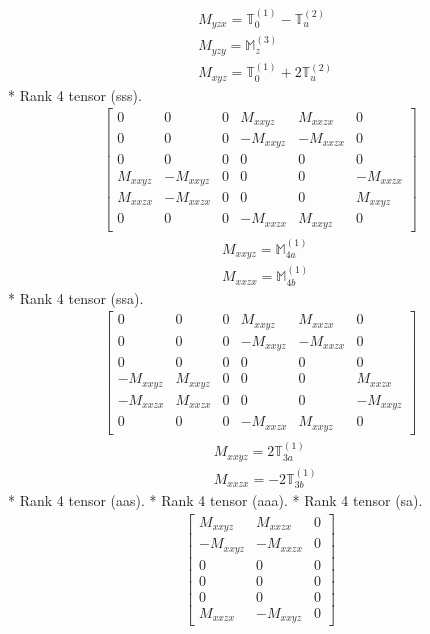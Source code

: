 \documentclass[fleqn,8pt,landscape]{jsarticle}
\begin{document}
\begin{align*}
& M_{yzx} = \mathbb{T}_{0}^{(1)} - \mathbb{T}_{u}^{(2)} \\
& M_{yzy} = \mathbb{M}_{z}^{(3)} \\
& M_{xyz} = \mathbb{T}_{0}^{(1)} + 2 \mathbb{T}_{u}^{(2)}
\end{align*}
* Rank 4 tensor (sss).
\begin{align*}
\begin{bmatrix} 0 & 0 & 0 & M_{xxyz} & M_{xxzx} & 0 \\ 0 & 0 & 0 & - M_{xxyz} & - M_{xxzx} & 0 \\ 0 & 0 & 0 & 0 & 0 & 0 \\ M_{xxyz} & - M_{xxyz} & 0 & 0 & 0 & - M_{xxzx} \\ M_{xxzx} & - M_{xxzx} & 0 & 0 & 0 & M_{xxyz} \\ 0 & 0 & 0 & - M_{xxzx} & M_{xxyz} & 0 \end{bmatrix}
\end{align*}
\begin{align*}
& M_{xxyz} = \mathbb{M}_{4a}^{(1)} \\
& M_{xxzx} = \mathbb{M}_{4b}^{(1)}
\end{align*}
* Rank 4 tensor (ssa).
\begin{align*}
\begin{bmatrix} 0 & 0 & 0 & M_{xxyz} & M_{xxzx} & 0 \\ 0 & 0 & 0 & - M_{xxyz} & - M_{xxzx} & 0 \\ 0 & 0 & 0 & 0 & 0 & 0 \\ - M_{xxyz} & M_{xxyz} & 0 & 0 & 0 & M_{xxzx} \\ - M_{xxzx} & M_{xxzx} & 0 & 0 & 0 & - M_{xxyz} \\ 0 & 0 & 0 & - M_{xxzx} & M_{xxyz} & 0 \end{bmatrix}
\end{align*}
\begin{align*}
& M_{xxyz} = 2 \mathbb{T}_{3a}^{(1)} \\
& M_{xxzx} = - 2 \mathbb{T}_{3b}^{(1)}
\end{align*}
* Rank 4 tensor (aas).
* Rank 4 tensor (aaa).
* Rank 4 tensor (sa).
\begin{align*}
\begin{bmatrix} M_{xxyz} & M_{xxzx} & 0 \\ - M_{xxyz} & - M_{xxzx} & 0 \\ 0 & 0 & 0 \\ 0 & 0 & 0 \\ 0 & 0 & 0 \\ M_{xxzx} & - M_{xxyz} & 0 \end{bmatrix}
\end{align*}
\end{document}
